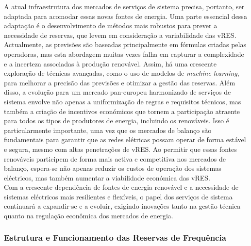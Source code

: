 A atual infraestrutura dos mercados de serviços de sistema precisa, portanto, ser adaptada para acomodar essas novas fontes de energia. Uma parte essencial dessa adaptação é o desenvolvimento de métodos mais robustos para prever a necessidade de reservas, que levem em consideração a variabilidade das \gls{vRES}. Actualmente, as previsões são baseadas principalmente em fórmulas criadas pelas operadoras, mas esta abordagem muitas vezes falha em capturar a complexidade e a incerteza associadas à produção renovável. Assim, há uma crescente exploração de técnicas avançadas, como o uso de modelos de \textit{machine learning}, para melhorar a precisão das previsões e otimizar a gestão das reservas.
Além disso, a evolução para um mercado pan-europeu harmonizado de serviços de sistema envolve não apenas a uniformização de regras e requisitos técnicos, mas também a criação de incentivos económicos que tornem a participação atraente para todos os tipos de produtores de energia, incluindo os renováveis. Isso é particularmente importante, uma vez que os mercados de balanço são fundamentais para garantir que as redes elétricas possam operar de forma estável e segura, mesmo com altas penetrações de \gls{vRES}. Ao permitir que essas fontes renováveis participem de forma mais activa e competitiva nos mercados de balanço, espera-se não apenas reduzir os custos de operação dos sistemas eléctricos, mas também aumentar a viabilidade económica das \gls{vRES}.\\
Com a crescente dependência de fontes de energia renovável e a necessidade de sistemas eléctricos mais resilientes e flexíveis, o papel dos serviços de sistema continuará a expandir-se e a evoluir, exigindo inovações tanto na gestão técnica quanto na regulação econômica dos mercados de energia.\\


\subsubsection{Estrutura e Funcionamento das Reservas de Frequência \label{se:reservas_freq}}


